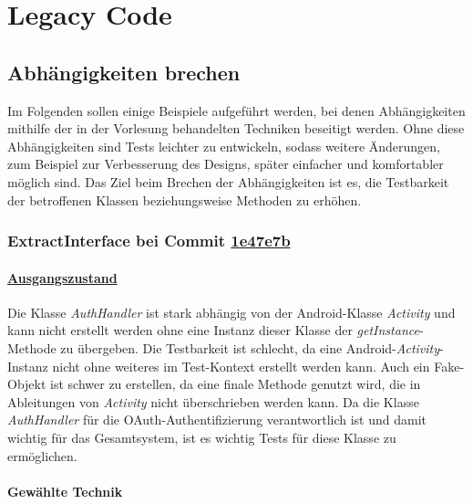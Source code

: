 \chapter{Legacy Code}
\label{ch:Legacy_Code}

\section{Abhängigkeiten brechen}

Im Folgenden sollen einige Beispiele aufgeführt werden, bei denen Abhängigkeiten mithilfe der in der Vorlesung behandelten Techniken beseitigt werden.
Ohne diese Abhängigkeiten sind Tests leichter zu entwickeln, sodass weitere Änderungen, zum Beispiel zur Verbesserung des Designs, später einfacher und komfortabler möglich sind.
Das Ziel beim Brechen der Abhängigkeiten ist es, die Testbarkeit der betroffenen Klassen beziehungsweise Methoden zu erhöhen.

\newpage

\subsection{ExtractInterface bei Commit \href{https://github.com/lukaspanni/OpenSourceStats/commit/1e47e7b2d42c04429a433a6ac3dbea781409d36d} {1e47e7b}}
\label{sec:ExtractInterface_AuthHandler_1}

\subsubsection*{\href{https://github.com/lukaspanni/OpenSourceStats/tree/0daf8862a81a976e3d6341f5b5461bc8d3c64b4f/app/src/main/java/de/lukaspanni/opensourcestats/auth/}{Ausgangszustand}}

Die Klasse \textit{AuthHandler} ist stark abhängig von der Android-Klasse \textit{Activity} und kann nicht erstellt werden ohne eine Instanz dieser Klasse der \textit{getInstance}-Methode zu übergeben.
Die Testbarkeit ist schlecht, da eine Android-\textit{Activity}-Instanz nicht ohne weiteres im Test-Kontext erstellt werden kann.
Auch ein Fake-Objekt ist schwer zu erstellen, da eine finale Methode genutzt wird, die in Ableitungen von \textit{Activity} nicht überschrieben werden kann.
Da die Klasse \textit{AuthHandler} für die OAuth-Authentifizierung verantwortlich ist und damit wichtig für das Gesamtsystem, ist es wichtig Tests für diese Klasse zu ermöglichen.

\subsubsection*{Gewählte Technik}

